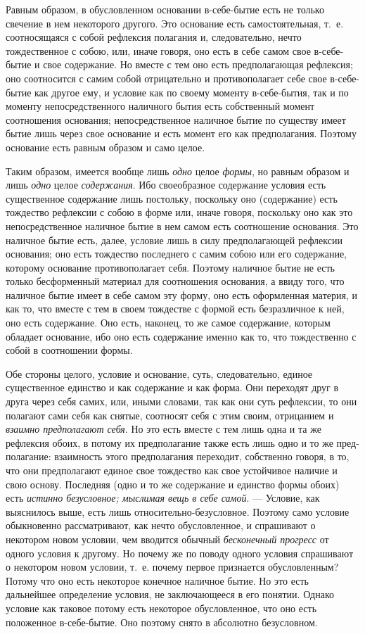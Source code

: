 Равным образом, в обусловленном основании в-себе-бытие есть не только
свечение в нем некоторого другого. Это основание есть самостоятельная,
т.~е. соотносящаяся с собой рефлексия полагания и, следовательно, нечто
тождественное с собою, или, иначе говоря, оно есть в себе самом свое
в-себе-бытие и свое содержание. Но вместе с тем оно есть предполагающая
рефлексия; оно соотносится с самим собой отрицательно и противополагает
себе свое в-себе-бытие как другое ему, и условие как по своему моменту
в-себе-бытия, так и по моменту непосредственного наличного бытия есть
собственный момент соотношения основания; непосредственное наличное бытие
по существу имеет бытие лишь через свое основание и есть момент его как
предполагания. Поэтому основание есть равным образом и само целое.

Таким образом, имеется вообще лишь {\em одно} целое
{\em формы}, но равным образом и лишь
{\em одно} целое {\em содержания}.
Ибо своеобразное содержание условия есть существенное содержание лишь
постольку, поскольку оно (содержание) есть тождество рефлексии с собою в
форме или, иначе говоря, поскольку оно как это непосредственное наличное
бытие в нем самом есть соотношение основания. Это наличное бытие есть,
далее, условие лишь в силу предполагающей рефлексии основания; оно есть
тождество последнего с самим собою или его содержание, которому основание
противополагает себя. Поэтому наличное бытие не есть только бесформенный
материал для соотношения основания, а ввиду того, что наличное бытие имеет
в себе самом эту форму, оно есть оформленная материя, и как то, что вместе
с тем в своем тождестве с формой есть безразличное к ней, оно есть
содержание. Оно есть, наконец, то же самое содержание, которым обладает
основание, ибо оно есть содержание именно как то, что тождественно с собой
в соотношении формы.

Обе стороны целого, условие и основание, суть, следовательно, единое
существенное единство и как содержание и как форма. Они переходят друг в
друга через себя самих, или, иными словами, так как они суть рефлексии, то
они полагают сами себя как снятые, соотносят себя с этим своим, отрицанием
и {\em взаимно предполагают себя}. Но это есть вместе с
тем лишь одна и та же рефлексия обоих, в потому их предполагание также есть
лишь одно и то же пред- полагание: взаимность этого предполагания
переходит, собственно говоря, в то, что они предполагают единое свое
тождество как свое устойчивое наличие и свою основу. Последняя (одно и то
же содержание и единство формы обоих) есть {\em истинно
безусловное; мыслимая вещь в себе самой}. — Условие, как выяснилось выше,
есть лишь относительно-безусловное. Поэтому само условие обыкновенно
рассматривают, как нечто обусловленное, и спрашивают о некотором новом
условии, чем вводится обычный {\em бесконечный
прогресс} от одного условия к другому. Но почему же по поводу одного
условия спрашивают о некотором новом условии, т.~е. почему первое
признается обусловленным? Потому что оно есть некоторое конечное наличное
бытие. Но это есть дальнейшее определение условия, не заключающееся в его
понятии. Однако условие как таковое потому есть некоторое обусловленное,
что оно есть положенное в-себе-бытие. Оно поэтому снято в абсолютно
безусловном.

